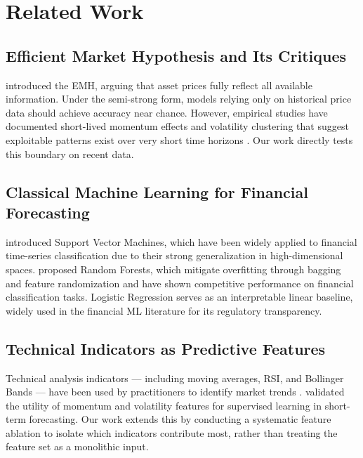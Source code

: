 \documentclass{article}
\begin{document}
\section{Related Work}

\subsection{Efficient Market Hypothesis and Its Critiques}

\citet{fama1970} introduced the EMH, arguing that asset prices fully reflect
all available information. Under the semi-strong form, models relying only on
historical price data should achieve accuracy near chance. However, empirical
studies have documented short-lived momentum effects and volatility clustering
that suggest exploitable patterns exist over very short time horizons
\citep{fischer2018}. Our work directly tests this boundary on recent data.

\subsection{Classical Machine Learning for Financial Forecasting}

\citet{cortes1995} introduced Support Vector Machines, which have been widely
applied to financial time-series classification due to their strong
generalization in high-dimensional spaces. \citet{breiman2001} proposed Random
Forests, which mitigate overfitting through bagging and feature randomization
and have shown competitive performance on financial classification tasks.
Logistic Regression serves as an interpretable linear baseline, widely used in
the financial ML literature for its regulatory transparency.

\subsection{Technical Indicators as Predictive Features}

Technical analysis indicators --- including moving averages, RSI, and Bollinger
Bands --- have been used by practitioners to identify market trends
\citep{murphy1999}. \citet{fischer2018} validated the utility of momentum and
volatility features for supervised learning in short-term forecasting. Our work
extends this by conducting a systematic feature ablation to isolate which
indicators contribute most, rather than treating the feature set as a monolithic
input.
\end{document}
